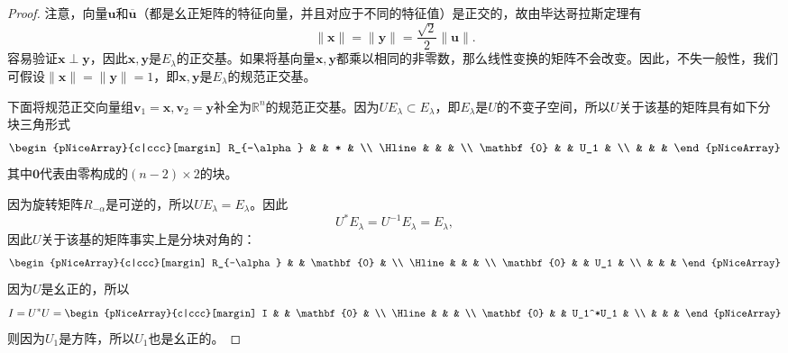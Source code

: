 \begin{proof}
    注意，向量$\mathbf{u}$和$\overline{\mathbf{u}}$（都是幺正矩阵的特征向量，并且对应于不同的特征值）是正交的，故由毕达哥拉斯定理有
    \[\|\mathbf{x}\|=\|\mathbf{y}\|=\frac{\sqrt2}{2}\|\mathbf{u}\|.\]
    容易验证$\mathbf{x}\perp\mathbf{y}$，因此$\mathbf{x},\mathbf{y}$是$E_\lambda$的正交基。如果将基向量$\mathbf{x},\mathbf{y}$都乘以相同的非零数，那么线性变换的矩阵不会改变。因此，不失一般性，我们可假设$\|\mathbf{x}\|=\|\mathbf{y}\|=1$，即$\mathbf{x},\mathbf{y}$是$E_\lambda$的规范正交基。

    下面将规范正交向量组$\mathbf{v}_1=\mathbf{x},\mathbf{v}_2=\mathbf{y}$补全为$\mathbb{R}^n$的规范正交基。因为$UE_\lambda\subset E_\lambda$，即$E_\lambda$是$U$的不变子空间，所以$U$关于该基的矩阵具有如下分块三角形式
    \begin{equation*}
        \begin{pNiceArray}{c|ccc}[margin]
            R_{-\alpha} &  & * & \\
            \Hline
            & & & \\
            \mathbf{0} & & U_1 & \\
            & & & 
        \end{pNiceArray}
    \end{equation*}
    其中$\mathbf{0}$代表由零构成的$(n-2)\times 2$的块。

    因为旋转矩阵$R_{-\alpha}$是可逆的，所以$UE_\lambda=E_\lambda$。因此
    \[U^*E_\lambda = U^{-1}E_\lambda = E_\lambda,\]
    因此$U$关于该基的矩阵事实上是分块对角的：
    \begin{equation*}
        \begin{pNiceArray}{c|ccc}[margin]
            R_{-\alpha} &  & \mathbf{0} & \\
            \Hline
            & & & \\
            \mathbf{0} & & U_1 & \\
            & & & 
        \end{pNiceArray}
    \end{equation*}
    因为$U$是幺正的，所以
    \begin{equation*}
        I = U^*U = \begin{pNiceArray}{c|ccc}[margin]
            I &  & \mathbf{0} & \\
            \Hline
            & & & \\
            \mathbf{0} & & U_1^*U_1 & \\
            & & & 
        \end{pNiceArray}
    \end{equation*}
    则因为$U_1$是方阵，所以$U_1$也是幺正的。


\end{proof}
